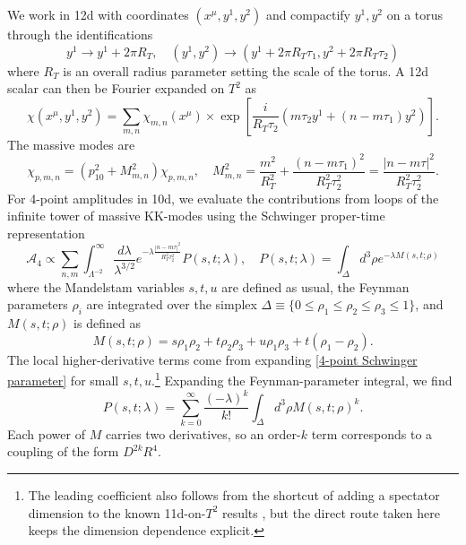 We work in 12d with coordinates $(x^\mu,y^1,y^2)$ and compactify $y^1,y^2$ on a torus through the identifications
\begin{equation}
y^1\to y^1+2\pi R_T,\quad
(y^1,y^2)\to (y^1+2\pi R_T\tau_1,y^2+2\pi R_T\tau_2)
\end{equation}
where $R_T$ is an overall radius parameter setting the scale of the torus. A 12d scalar can then be Fourier expanded on $T^2$ as
\begin{equation}
\chi(x^\mu,y^1,y^2)
=\sum_{m,n}\chi_{m,n}(x^\mu) \times\exp
\left[
\frac{i}{R_T\tau_2}\left(m\tau_2y^1 + (n-m\tau_1)y^2\right)
\right].
\end{equation}
The massive modes are
\begin{equation}
[-\nabla^2_{10}-\nabla^2_2]\chi_{p,m,n}
=\left(p_{10}^2+M_{m,n}^2\right)\chi_{p,m,n},\quad
M^2_{m,n}
= \frac{m^2}{R_T^2}+\frac{(n-m\tau_1)^2}{R_T^2\tau_2^2}
=\frac{|n-m\tau|^2}{R_T^2\tau_2^2}.
\end{equation}
For 4-point amplitudes in 10d, we evaluate the contributions from loops of the infinite tower of massive KK-modes using the Schwinger proper-time representation
\cite{Green:1997as,Beccaria:2023hhi}
\begin{equation}
\mathcal{A}_4
\propto \sum_{n,m}\int_{\Lambda^{-2}}^\infty
\frac{d\lambda}{\lambda^{3/2}}
e^{-\lambda \frac{|n-m\tau|^2}{R_T^2\tau_2^2}}
P(s,t;\lambda),\quad
P(s,t;\lambda) = \int_{\Delta} d^3\rho  e^{-\lambda M(s,t;\rho)}
\label{4-point Schwinger parameter}
\end{equation}
where the Mandelstam variables $s,t,u$ are defined as usual, the Feynman parameters $\rho_i$ are integrated over the simplex $\Delta \equiv \{0\le\rho_1\le\rho_2\le\rho_3\le1\}$, and $M(s,t;\rho)$ is defined as
\begin{equation}
M(s,t;\rho)=s\rho_1\rho_2+t\rho_2\rho_3+u\rho_1\rho_3 + t(\rho_1-\rho_2).
\end{equation}
The local higher-derivative terms come from expanding \eqref{4-point Schwinger parameter} for small $s,t,u$.\footnote{The leading coefficient also follows from the shortcut of adding a spectator dimension to the known 11d-on-$T^2$ results \cite{Green:1997as}, but the direct route taken here keeps the dimension dependence explicit.}
Expanding the Feynman-parameter integral, we find
\begin{equation}
P(s,t;\lambda)
= \sum_{k=0}^\infty \frac{(-\lambda)^k}{k!}\int_{\Delta} d^3\rho  M(s,t;\rho)^k.
\end{equation}
Each power of $M$ carries two derivatives, so an order-$k$ term corresponds to a coupling of the form $D^{2k}R^4$.
